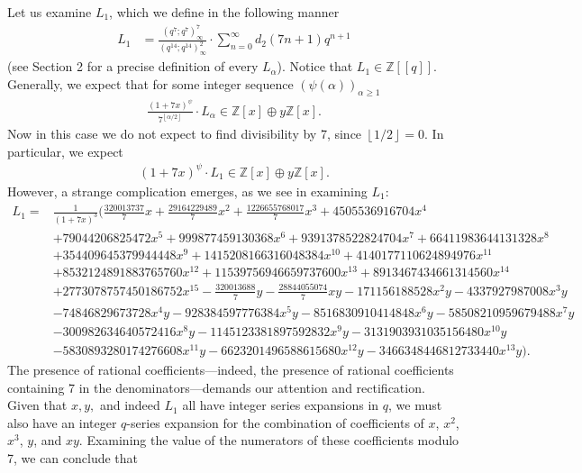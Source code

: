 \documentclass[reqno]{amsart}
\theoremstyle{definition}
\theoremstyle{remark}
\numberwithin{equation}{section}
\begin{document}
Let us examine $L_1$, which we define in the following manner
\begin{align*}
L_{1} &= \frac{(q^7;q^7)^{7}_{\infty}}{(q^{14};q^{14})^2_{\infty}}\cdot\sum_{n=0}^{\infty} d_2(7n + 1)q^{n+1}
\end{align*} (see Section 2 for a precise definition of every $L_{\alpha}$).  Notice that $L_1\in\mathbb{Z}[[q]]$.  %
Generally, we expect that for some integer sequence $\left(\psi(\alpha)\right)_{\alpha\ge 1}$
\begin{align*}
\frac{(1+7x)^{\psi}}{7^{\left\lfloor \alpha/2 \right\rfloor}}\cdot L_{\alpha}\in\mathbb{Z}[x]\oplus y\mathbb{Z}[x].
\end{align*} 
Now in this case we do not expect to find divisibility by 7, since $\left\lfloor 1/2 \right\rfloor = 0$. In particular, we expect
\begin{align*}
(1+7x)^{\psi}\cdot L_{1}\in\mathbb{Z}[x]\oplus y\mathbb{Z}[x].
\end{align*}  However, a strange complication emerges, as we see in examining $L_1$:
\begin{align}
L_1 =& \frac{1}{(1+7x)^3}\Bigg( \frac{320013737}{7}x + \frac{29164229489}{7} x^2 + \frac{1226655768017}{7} x^3 + 
 4505536916704 x^4\label{L1expressxy}\\ &+ 79044206825472 x^5 + 999877459130368 x^6 + 
 9391378522824704 x^7 + 66411983644131328 x^8\nonumber\\ &+ 
 354409645379944448 x^9 + 1415208166316048384 x^{10} + 
 4140177110624894976 x^{11}\nonumber\\ &+ 8532124891883765760 x^{12} + 
 11539756946659737600 x^{13} + 8913467434661314560 x^{14}\nonumber\\ &+ 
 2773078757450186752 x^{15} - \frac{320013688}{7}y - \frac{28844055074}{7}xy - 
 171156188528 x^2 y - 4337927987008 x^3 y\nonumber\\ &- 74846829673728 x^4 y - 
 928384597776384 x^5 y - 8516830910414848 x^6 y - 
 58508210959679488 x^7 y\nonumber\\ &- 300982634640572416 x^8 y - 
 1145123381897592832 x^9 y - 3131903931035156480 x^{10} y\nonumber\\ &- 
 5830893280174276608 x^{11} y - 6623201496588615680 x^{12} y - 
 3466348446812733440 x^{13} y\Bigg).\nonumber
\end{align}  The presence of rational coefficients---indeed, the presence of rational coefficients containing 7 in the denominators---demands our attention and rectification.  Given that $x,y,$ and indeed $L_1$ all have integer series expansions in $q$, we must also have an integer $q$-series expansion for the combination of coefficients of $x$, $x^2$, $x^3$, $y$, and $xy$.  Examining the value of the numerators of these coefficients modulo 7, we can conclude that
\end{document}
